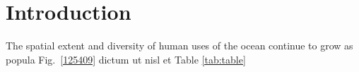 \section{Introduction}
\label{introduction}

The spatial extent and diversity of human uses of the ocean continue to grow as popula Fig.~\ref{125409} dictum ut nisl et Table \ref{tab:table}
